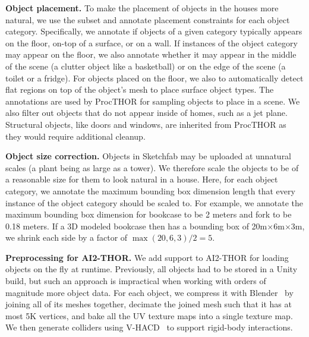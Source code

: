 \textbf{Object placement.} To make the placement of objects in the houses more natural, we use the \datalvis subset and annotate placement constraints for each object category. Specifically, we annotate if objects of a given category typically appears on the floor, on-top of a surface, or on a wall. If instances of the object category may appear on the floor, we also annotate whether it may appear in the middle of the scene (\eg a clutter object like a basketball) or on the edge of the scene (\eg a toilet or a fridge). For objects placed on the floor, we also to automatically detect flat regions on top of the object's mesh to place surface object types. The annotations are used by ProcTHOR for sampling objects to place in a scene. We also filter out \datalvis objects that do not appear inside of homes, such as a jet plane. Structural objects, like doors and windows, are inherited from ProcTHOR as they would require additional cleanup.

\textbf{Object size correction.} Objects in Sketchfab may be uploaded at unnatural scales (\eg a plant being as large as a tower). We therefore scale the objects to be of a reasonable size for them to look natural in a house. Here, for each object category, we annotate the maximum bounding box dimension length that every instance of the object category should be scaled to. For example, we annotate the maximum bounding box dimension for bookcase to be 2 meters 
and fork to be 0.18 meters. If a 3D modeled bookcase then has a bounding box of 20m$\times$6m$\times$3m, we shrink each side by a factor of $\max(20, 6, 3)/2 = 5$. 

\textbf{Preprocessing for AI2-THOR.} We add support to AI2-THOR for loading objects on the fly at runtime. Previously, all objects had to be stored in a Unity build, but such an approach is impractical when working with orders of magnitude more object data. For each object, we compress it with Blender~\cite{blender} by joining all of its meshes together, decimate the joined mesh such that it has at most 5K vertices, and bake all the UV texture maps into a single texture map. We then generate colliders using V-HACD~\cite{mamou2016volumetric} to support rigid-body interactions.

